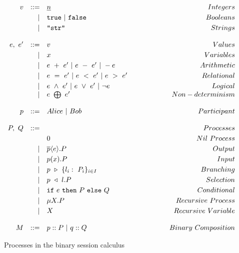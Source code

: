 \documentclass[12pt,twoside]{report}
\newcommand{\white}{\ \ \ \ \ \ \ \ \ \ \ \ }
\begin{document}
\begin{figure}[h]
    \centering
    \begin{equation*}
    \centering
    \begin{array}{rrlcr}
        v & ::= & \underline{n} & \white & Integers \\[2.75pt]
              & |  & \texttt{true}\ |\ \texttt{false} & \white & Booleans \\[2.75pt]
              & | & \texttt{"str"} & \white & Strings \\\\
        e,\ e' & ::= & v & \white & Values \\[2.75pt]
              & |  & x & \white & Variables \\[2.75pt]
              & | & e\ +\ e'\ |\ e\ -\ e'\ |\ -e & \white & Arithmetic \\[2.75pt]
              & | & e\ =\ e'\ |\ e\ <\ e'\ |\ e\ >\ e' & \white & Relational \\[2.75pt]
              & | & e\ \land\ e'\ |\ e\ \lor\ e'\ |\ \lnot e & \white & Logical \\
              & | & e\ \bigoplus\ e' & \white & Non-determinism\\\\
        
        
        p & ::= & Alice\ |\ Bob & \white & Participant\\\\
        P,\ Q & ::= && \white & Processes \\[2.75pt]
             &   & 0 & \white & Nil\ Process  \\[2.75pt]
             & | & \overline{p} \langle e \rangle.P & \white & Output \\[2.75pt] 
             & | & p(x).P & \white & Input\\[2.75pt]
             & | & p\ \triangleright\ \{l_i:\ P_i\}_{i\in I}& \white & Branching\\[2.75pt]
             & | & p\ \triangleleft\ l.P& \white & Selection \\[2.75pt]
             & | & \texttt{if}\ e\ \texttt{then}\ P\ \texttt{else}\ Q & \white & Conditional \\[2.75pt]
             & | & \mu X.P & \white  & Recursive\ Process \\[2.75pt]
             & | & X & \white  & Recursive\ Variable \\\\
             
        M & ::= & p :: P\ |\ q :: Q & \white & Binary\ Composition
        \end{array}
    \end{equation*}
    \caption{Processes in the binary session calculus}
    \label{bst_session_calc}
\end{figure}{}
\end{document}
